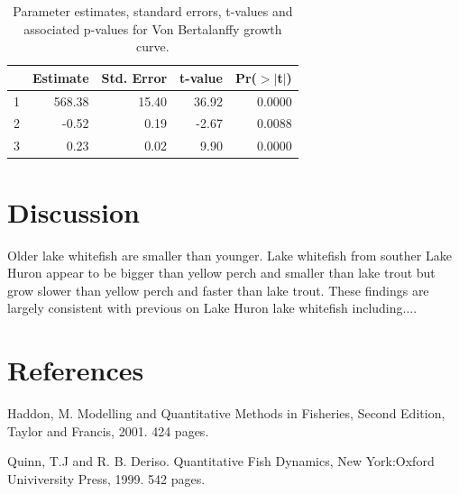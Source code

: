 \documentclass{article}\usepackage[]{graphicx}\usepackage[]{color}
\begin{document}
\begin{table}[ht]
\centering
\begin{tabular}{rrrrr}
  \hline
 & Estimate & Std. Error & t-value & Pr($>$$|$t$|$) \\ 
  \hline
1 & 568.38 & 15.40 & 36.92 & 0.0000 \\ 
  2 & -0.52 & 0.19 & -2.67 & 0.0088 \\ 
  3 & 0.23 & 0.02 & 9.90 & 0.0000 \\ 
   \hline
\end{tabular}
\caption{Parameter estimates, standard errors, t-values and associated p-values for Von Bertalanffy growth curve.} 
\label{tbl:estimates}
\end{table}




\section*{Discussion}
\label{sec:discussion}

Older lake whitefish are smaller than younger.  Lake whitefish from
souther Lake Huron appear to be bigger than yellow perch and smaller
than lake trout but grow slower than yellow perch and faster than lake
trout.  These findings are largely consistent with previous on Lake
Huron lake whitefish including....


\clearpage
\section*{References}
\label{sec:references}

\vspace{10 mm}

Haddon, M. Modelling and Quantitative Methods in Fisheries, Second Edition, Taylor and Francis, 2001. 424 pages.

\vspace{10 mm}

Quinn, T.J and R. B. Deriso. Quantitative Fish Dynamics, New York:Oxford Univiversity Press, 1999. 542 pages.
\end{document}

